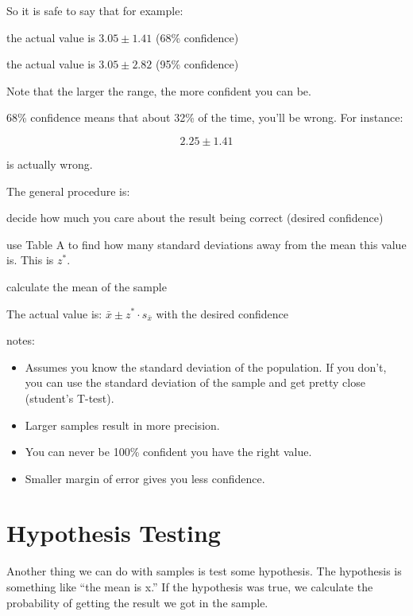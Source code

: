 \documentclass[landscape]{exam}
\begin{document}
  So it is safe to say that for example:
  \begin{itemize*}
    \item the actual value is $3.05 \pm 1.41$ (68\% confidence)
    \item the actual value is $3.05 \pm 2.82$ (95\% confidence)
  \end{itemize*}

  Note that the larger the range, the more confident you can be. 
  
  68\% confidence means that about 32\% of the time, you'll be wrong. For
  instance:

  \[
    2.25 \pm 1.41
  \] 

  is actually wrong.

  The general procedure is:
  \begin{enumerate*}
    \item decide how much you care about the result being correct (desired
      confidence)

    \item use Table A to find how many standard deviations away from the mean
      this value is. This is $z^*$.

    \item calculate the mean of the sample

    \item The actual value is: $\bar{x} \pm z^* \cdot s_{\bar{x}}$ with the
      desired confidence

  \end{enumerate*}

  notes:
  \begin{itemize}
    \item Assumes you know the standard deviation of the population. If you
      don't, you can use the standard deviation of the sample and get pretty
      close (student's T-test).

    \item Larger samples result in more precision.

    \item You can never be 100\% confident you have the right value.

    \item Smaller margin of error gives you less confidence.
  \end{itemize}


  \section{Hypothesis Testing}
  Another thing we can do with samples is test some hypothesis. The hypothesis
  is something like ``the mean is x.'' If the hypothesis was true, we calculate
  the probability of getting the result we got in the sample.
\end{document}
